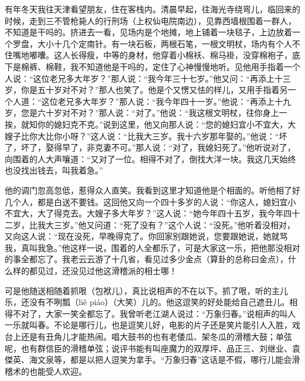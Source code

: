 \documentclass[12pt,UTF8]{ctexbook}
\begin{document}
有年冬天我往天津看望朋友，住在客栈内。清晨早起，往海光寺绕弯儿，临回来的时候，走到三不管枪毙人的行刑场（上权仙电院南边），见靠西墙根围着一群人，不知道是干吗的。挤进去一看，见场内是个地摊，地上铺着一块毯子，上边放着一个罗盘，大小十几个定南针。有一块石板，两根石笔，一根文明杖，场内有个人不住嘴地嘟囔。这人长得瘦，中等的身材，他穿着小棉袄、棉马褂，没穿棉袍子，底下是棉裤、棉鞋，我不知道他是干吗的，定住了心神慢慢地听。见他用手指着一个人说：“这位老兄多大年岁？”那人说：“我今年三十七岁。”他又问：“再添上十三岁，你是五十岁对不对？”那人也笑了。他是个又愣又怯的样儿，又用手指着另一个人道：“这位老兄多大年岁？”那人说：“我今年四十一岁。”他说：“再添上十九岁，您是六十岁对不对？”那人说：“对了。”他说：“我这根文明杖，往你身上一挨，就知你的媳妇克不克。”说到这里，他又向那人说：“您的媳妇宜小不宜大，大嫂子比你大比你小呀？”这人说：“比我大三岁。我十六岁那年娶的。”他说：“坏了，坏了，娶得早了，非克妻不可。”那人说：“对了，我媳妇死了。”他听说对了，向围着的人大声嚷道：“又对了一位。相得不对了，倒找大洋一块。我这几天始终也没找出钱去，叫我着急。”

他的调门忽高忽低，惹得众人直笑。我看到这里才知道他是个相面的。听他相了好几个人，都是白送不要钱。这回他又向一个四十多岁的人说：“你这人，媳妇宜小不宜大，大了得克去。大嫂子多大年岁？”这人说：“她今年四十五岁，我今年四十二岁，比我大三岁。”他又问道：“死了没有？”这个人说：“没死。”他听着没相对，又向这人说：“现在没死，早晚得克了。你回家别跟她说，您要跟她说，她就骂我，真叫我急。”他这样一说，围着的人全都乐了，可是大家这一乐，把他那没相对的事全都忘了。我老云云游了十几省，看见过多少金点（算卦的总称曰金点），什么样的都见过，还没见过他这滑稽派的相士哪！

可是他随送相随着抓哏（包袱儿），真比说相声的不在以下。抓了哏，听的主儿乐，还没有不咧瓢（liě piáo）（大笑）儿的。他这逗笑的好处能给自己遮丑儿。相得不对了，大家一笑全都忘了。我曾听老江湖人说过：“万象归春。”说相声的叫人一乐就叫春。不论是哪行儿，也是逗笑儿好，电影的片子还是笑片能引人入胜，戏台上还是有丑角儿才能热闹。唱大鼓书的也有老倭瓜、架冬瓜的滑稽大鼓；单弦呢，也有群信臣的滑稽单弦；说评书能有叫座魔力的双厚坪、品正三、刘继业、袁傑英、海文泉等，都是以把人逗笑为拿手。“万象归春”这话是不假，哪行儿能会滑稽术的也能受人欢迎。
\end{document}
